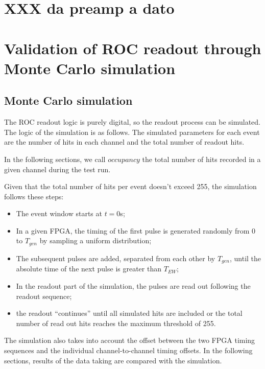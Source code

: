     
 \section{XXX da preamp a dato} 
\section{Validation of ROC readout through Monte Carlo simulation}

\subsection{Monte Carlo simulation}\label{MonteCarlo}
 
The ROC readout logic is purely digital, so the readout process can be simulated. 
The logic of the simulation is as follows.
The simulated parameters for each event are the number of hits in each channel
and the total number of readout hits.

In the following sections, we call $occupancy$ the total number of hits
recorded in a given channel during the test run.

Given that the total number of hits per event doesn't exceed 255, the simulation follows these steps:
\begin{itemize}
\item
  The event window starts at $t=0$s;
\item
  In a given FPGA, the timing of the first pulse is generated randomly from 0 to $T_{gen}$
  by sampling a uniform distribution;
\item
  The subsequent pulses are added, separated from each other by $T_{gen}$,
  until the absolute time
  of the next pulse is greater than $T_{EW}$;
\item
  In the readout part of the simulation, the pulses are read out following the readout sequence;
\item
  the readout ``continues'' until all simulated hits are included or
  the total number of read out hits reaches the maximum threshold of 255. 
\end{itemize}

The simulation also takes into account the offset between the two FPGA timing sequences
and the individual channel-to-channel timing offsets. 
In the following sections, results of the data taking are compared with the simulation.
